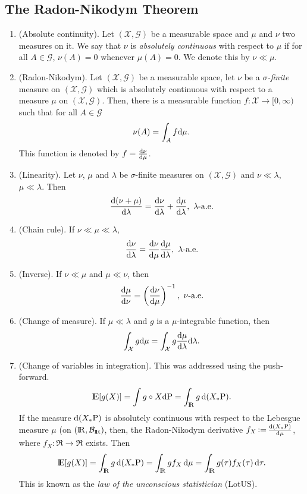 \documentclass[a4paper,10pt]{scrbook}
\begin{document}
\subsection{The Radon-Nikodym Theorem}
\begin{enumerate}
 \item (Absolute continuity).
       Let $(\mathcal{X}, \mathscr{G})$ be a measurable space and $\mu$ and $\nu$ two measures on it.
       We say that $\nu$ is \textit{absolutely continuous} with respect to $\mu$ if
       for all $A\in\mathscr{G}$, $\nu(A)=0$ whenever $\mu(A)=0$. We denote this by $\nu\ll\mu$.
 \item (Radon-Nikodym). Let $(\mathcal{X}, \mathscr{G})$ be a measurable space, let $\nu$ be a \textit{$\sigma$-finite}
       measure on $(\mathcal{X}, \mathscr{G})$ which is {absolutely continuous} with respect 
       to a measure $\mu$ on $(\mathcal{X}, \mathscr{G})$. Then, there is a measurable function $f:\mathcal{X}\to[0,\infty)$
       such that for all $A\in \mathcal{G}$
       \[
        \nu(A) = \int_A f \mathrm{d} \mu.
       \]
      This function is denoted by $f=\frac{\mathrm{d}\nu}{\mathrm{d} \mu}$.
 \item (Linearity). Let $\nu$, $\mu$ and $\lambda$ be $\sigma$-finite measures on $(\mathcal{X}, \mathscr{G})$ and $\nu\ll\lambda$, $\mu\ll\lambda$.
       Then
       \[
        \frac{\d(\nu+\mu)}{\d \lambda} = \frac{\d \nu}{\d \lambda} + \frac{\d \mu}{\d \lambda},\ \lambda\text{-a.e.}
       \]
 \item (Chain rule). If $\nu\ll\mu\ll\lambda$,
 \[
  \frac{\d\nu}{\d\lambda} = \frac{\d\nu}{\d\mu} \frac{\d\mu}{\d\lambda},\ \lambda\text{-a.e.} 
 \]
 \item (Inverse). If $\nu\ll\mu$ and $\mu\ll\nu$, then
 \[
  \frac{\mathrm{d} \mu}{\mathrm{d} \nu} = \left( \frac{\mathrm{d} \nu}{\mathrm{d} \mu}\right)^{-1},\ \nu\text{-a.e.}
 \]
 \item (Change of measure).
 If $\mu\ll\lambda$ and $g$ is a $\mu$-integrable function, then
 \[
  \int_{\mathcal{X}} g \mathrm{d} \mu = \int_{\mathcal{X}} g \frac{\mathrm{d} \mu}{\mathrm{d} \lambda}\mathrm{d} \lambda.
 \]
 \item (Change of variables in integration). This was addressed using the push-forward. 
 \[
  \E[g(X)] = \int g\circ X\d\prob = \int_\Re g \,\d(X_*\prob).
 \]
 If the measure $\mathrm{d}(X_*\mathrm{P})$ is absolutely continuous with respect to the Lebesgue 
 measure $\mu$ (on $(\Re, \B_\Re)$, then, the Radon-Nikodym derivative $f_X{}\mathop{\mathrel{:}=}{} \frac{\mathrm{d}(X_*\mathrm{P})}{\mathrm{d} \mu}$,
 where $f_X:\Re\to\Re$ exists. Then
 \[
  \E[g(X)] = \int_\Re g\, \d(X_*\prob) = \int_\Re g f_X\, \d\mu = \int_\Re g(\tau)f_X(\tau)\,\d \tau.
 \]
 This is known as the \textit{law of the unconscious statistician} (LotUS).

\end{enumerate}
\end{document}
